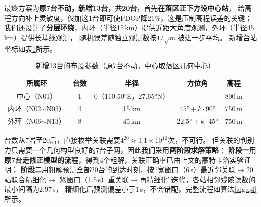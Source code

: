 \documentclass[draft,12pt,a4paper]{ctexart}
\theoremstyle{definition}
\begin{document}
最终方案为\textbf{原7台不动，新增13台，共20台}，首先\textbf{在落区正下方设中心站}，
给高程方向补上灵敏度，仅加这1台即可使PDOP降$21\%$，这是压制高程误差的关键；
我们还设计了\textbf{分层环绕}，内环（半径15\,km）提供近距大角度观测，外环（半径45\,km）提供长基线观测，
随机误差随独立观测数按$1/\sqrt{m}$被进一步平均。
新增台站坐标如表\ref{tab:q4-ring}所示。

\begin{table}[H]\centering
  \caption{新增13台的布设参数（原7台不动，中心取落区几何中心）}\label{tab:q4-ring}
  \small
  \begin{tabular}{ccccc}
    \toprule
    \textbf{所属环} & \textbf{台数} & \textbf{半径} & \textbf{方位角} & \textbf{高程} \\
    \midrule
    中心（N01） & 1 & 0（$110.50°$E，$27.65°$N） & --- & 800\,m \\
    内环（N02$\sim$N05） & 4 & 15\,km & $45°+k\cdot90°$ & 750\,m \\
    外环（N06$\sim$N13） & 8 & 45\,km & $22.5°+k\cdot45°$ & 750\,m \\
    \bottomrule
  \end{tabular}
\end{table}

台数从7增至20后，直接枚举关联需要$4^{20}\approx1.1\times10^{12}$次，不可行。
但关联的判别力只需要一个几何构型良好的7台子网，因此我们采用\textbf{两阶段求解策略}：
\textbf{阶段一}用\textbf{原7台走修正模型的流程}，得到4个粗解，关联正确率已由上文的蒙特卡洛实验证明；
\textbf{阶段二}用粗解预测全部20台的到达时刻，按``宽窗口（6\,s）最近邻关联$\to$20站联合精细化$\to$
紧窗口（1.5\,s）重关联$\to$再精细化''迭代，各站相邻残骸读数的最小间隔为$2.97$\,s，
精细化后预测偏差小于$1$\,s，不会错配。完整流程如算法\ref{alg:q4}所示。
\end{document}
